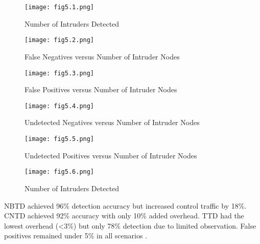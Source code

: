 \documentclass[final,5p,times,twocolumn]{elsarticle}
\begin{document}
\begin{figure}[htbp]
    \centering
    \texttt{[image: fig5.1.png]} 
    \caption{Number of Intruders Detected \cite{Khan2017}}
    \label{fig:system_architecture}
    \end{figure}
    \begin{figure}[htbp]
      \centering
      \texttt{[image: fig5.2.png]} 
      \caption{False Negatives versus Number of Intruder Nodes \cite{Khan2017}}
      \label{fig:false_negatives}
    \end{figure}
    \begin{figure}[htbp]
      \centering
      \texttt{[image: fig5.3.png]} 
      \caption{False Positives versus Number of Intruder Nodes \cite{Khan2017}}
      \label{fig:false_positives}
    \end{figure}
    \begin{figure}[htbp]
      \centering
      \texttt{[image: fig5.4.png]} 
      \caption{Undetected Negatives versus Number of Intruder Nodes \cite{Khan2017}}
      \label{fig:undetected_negatives}
    \end{figure}
    \begin{figure}[htbp]
      \centering
      \texttt{[image: fig5.5.png]} 
      \caption{Undetected Positives versus Number of Intruder Nodes \cite{Khan2017}}
      \label{fig:undetected_positives}
    \end{figure}
    \begin{figure}[htbp]
      \centering
      \texttt{[image: fig5.6.png]} 
      \caption{Number of Intruders Detected \cite{Khan2017}}
      \label{fig:intruders_detected}
    \end{figure}

    NBTD achieved 96\% detection accuracy but increased control traffic by 18\%. CNTD achieved 92\% accuracy with only 10\% added overhead. TTD had the lowest overhead (<3\%) but only 78\% detection due to limited observation. False positives remained under 5\% in all scenarios \cite{Khan2017}.
\end{document}
